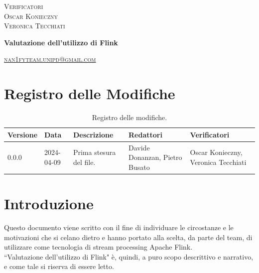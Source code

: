 \documentclass[8pt]{article}
\begin{document}
\begin{titlepage}
\begin{minipage}[t]{0.47\textwidth}
{		}
		\vspace{8mm}
		
		{\large{\textsc{Verificatori}}
			\vspace{3mm}
			{\\\large{\textsc{Oscar Konieczny}\\}}  %
			{\large{\textsc{Veronica Tecchiati}}}
			
		}
		\vspace{4mm}\vspace{4mm}
	\end{minipage}
	\vspace{4cm}
	\begin{center}
		\begin{flushright}
			{\fontsize{30pt}{52pt}\selectfont \textbf{Valutazione dell'utilizzo di Flink\\}} %
		\end{flushright}
		\vspace{3cm}
	\end{center}
	\vspace{9.5cm}
	{\small \textsc{\href{mailto: nan1fyteam.unipd@gmail.com}{nan1fyteam.unipd@gmail.com}}}
\end{titlepage}
\pagestyle{mystyle}
\section*{Registro delle Modifiche}
\begin{table}[ht!]
\hypersetup{hidelinks}
	\centering
	\begin{tabular}{p{1.2cm} p{2cm} p{4cm} p{4cm} p{3cm}}
		\toprule
		\textbf{Versione} & \textbf{Data} & \textbf{Descrizione} & \textbf{Redattori} & \textbf{Verificatori} \\
		\midrule
            0.0.0 & 2024-04-09 & Prima stesura del file. & Davide Donanzan, Pietro Busato & Oscar Konieczny, Veronica Tecchiati \\
		\bottomrule
	\end{tabular}
	\caption{Registro delle modifiche.}\label{table:Registro delle modifiche}
\end{table}
\newpage
\tableofcontents
\clearpage
\newpage
\justifying
\section{Introduzione}
Questo documento viene scritto con il fine di individuare le circostanze e le motivazioni che si celano dietro e hanno portato alla scelta, da parte del team, di utilizzare come tecnologia di stream processing Apache Flink.\\
``Valutazione dell'utilizzo di Flink" è, quindi, a puro scopo descrittivo e narrativo, e come tale si riserva di essere letto.
\end{document}

